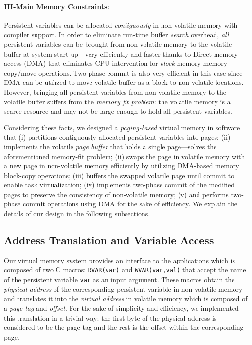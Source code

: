 \paragraph{III-Main Memory Constraints:} Persistent variables can be allocated \emph{contiguously} in non-volatile memory with compiler support. In order to eliminate run-time buffer \emph{search} overhead, \emph{all} persistent variables can be brought from non-volatile memory to the volatile buffer at system start-up---very efficiently and faster thanks to Direct memory access (DMA) that eliminates CPU intervention for \emph{block} memory-memory copy/move operations. Two-phase commit is also very efficient in this case since DMA can be utilized to move volatile buffer as a block to non-volatile locations. However, bringing all persistent variables from non-volatile memory to the volatile buffer suffers from the \emph{memory fit problem}: the volatile memory is a scarce resource and may not be large enough to hold all persistent variables. 

Considering these facts, we designed a \emph{paging-based} virtual memory in software that (i) partitions contiguously allocated persistent variables into pages; (ii) implements the volatile \emph{page buffer} that holds a single page---solves the aforementioned memory-fit problem; (ii) swaps the page in volatile memory with a new page in non-volatile memory efficiently by utilizing DMA-based memory block-copy operations; (iii) buffers the swapped volatile page until commit to enable task virtualization; (iv) implements two-phase commit of the modified pages to preserve the consistency of non-volatile memory; (v) and performs two-phase commit operations using DMA for the sake of efficiency. We explain the details of our design in the following subsections.  

\subsection{Address Translation and Variable Access}

Our virtual memory system provides an interface to the applications which is composed of two C macros: \texttt{RVAR(var)} and \texttt{WVAR(var,val)} that accept the name of the persistent variable \texttt{var} as an input argument. These macros obtain the \emph{physical address} of the corresponding persistent variable in non-volatile memory and translates it into the \emph{virtual address} in volatile memory which is composed of a \emph{page tag} and \emph{offset}. For the sake of simplicity and efficiency, we implemented this translation in a trivial way: the first byte of the physical address is considered to be the page tag and the rest is the offset within the corresponding page. 

